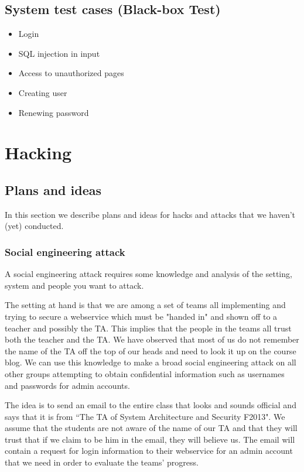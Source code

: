 \documentclass[a4paper]{article}
\begin{document}
\subsection{System test cases (Black-box Test)}

\begin{itemize}
\item Login
\item SQL injection in input
\item Access to unauthorized pages
\item Creating user
\item Renewing password
\end{itemize}


\section{Hacking}
\subsection{Plans and ideas}
In this section we describe plans and ideas for hacks and attacks that we haven't (yet) conducted.
\subsubsection{Social engineering attack}
A social engineering attack requires some knowledge and analysis of the setting, system and people you want to attack.

The setting at hand is that we are among a set of teams all implementing and trying to secure a webservice which must be "handed in" and shown off to a teacher and possibly the TA. This implies that the people in the teams all trust both the teacher and the TA. We have observed that most of us do not remember the name of the TA off the top of our heads and need to look it up on the course blog.
We can use this knowledge to make a broad social engineering attack on all other groups attempting to obtain confidential information such as usernames and passwords for admin accounts.

The idea is to send an email to the entire class that looks and sounds official and says that it is from ``The TA of System Architecture and Security F2013". We assume that the students are not aware of the name of our TA and that they will trust that if we claim to be him in the email, they will believe us. The email will contain a request for login information to their webservice for an admin account that we need in order to evaluate the teams' progress.
\end{document}
